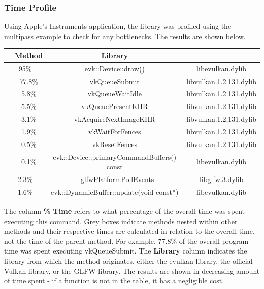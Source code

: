 \documentclass[12pt]{report}
\newcommand{\bgcell}{\cellcolor{lightgray}}
\theoremstyle{definition}
\begin{document}
      \subsubsection{Time Profile}

        Using Apple's Instruments application, the library was profiled using
        the multipass example to check for any bottlenecks. The results are
        shown below.

        \begin{center}
          \begin{tabular}{ |c c|c|c| } 
            \hline
            \rowcolor{lightgray}\multicolumn{2}{|c|}{\%Time} & Method & Library \\
            \hline
            \multicolumn{2}{|c|}{95\%} & evk::Device::draw() & libevulkan.dylib \\
            \bgcell & 77.8\% & vkQueueSubmit & libvulkan.1.2.131.dylib \\
            \bgcell & 5.8\% & vkQueueWaitIdle & libvulkan.1.2.131.dylib \\
            \bgcell & 5.5\% & vkQueuePresentKHR & libvulkan.1.2.131.dylib \\
            \bgcell & 3.1\% & vkAcquireNextImageKHR & libvulkan.1.2.131.dylib \\
            \bgcell & 1.9\% & vkWaitForFences & libvulkan.1.2.131.dylib \\
            \bgcell & 0.5\% & vkResetFences & libvulkan.1.2.131.dylib \\
            \bgcell & 0.1\% & evk::Device::primaryCommandBuffers() const & libevulkan.dylib \\
            \multicolumn{2}{|c|}{2.3\%} & \_glfwPlatformPollEvents & libglfw.3.dylib \\
            \multicolumn{2}{|c|}{1.6\%} & evk::DynamicBuffer::update(void const*) & libevulkan.dylib \\
            \hline
          \end{tabular}
        \end{center}

        The column \textbf{\% Time} refers to what percentage of the overall time was
        spent executing this command. Grey boxes indicate methods nested
        within other methods and their respective times are calculated in
        relation to the overall time, not the time of the parent method.
        For example, 77.8\% of the overall program time was spent executing
        vkQueueSubmit. The \textbf{Library} column indicates the library from which
        the method originates, either the evulkan library, the official Vulkan
        library, or the GLFW library. The results are shown in decreasing
        amount of time spent - if a function is not in the table, it has a
        negligible cost. \\
\end{document}
